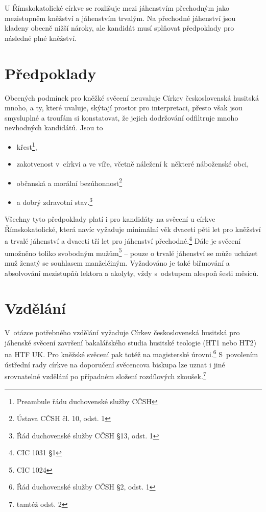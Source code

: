 U Římskokatolické církve se rozlišuje mezi jáhenstvím přechodným jako
mezistupněm kněžství a jáhenstvím trvalým. Na přechodné jáhenství jsou kladeny
obecně nižší nároky, ale kandidát musí splňovat předpoklady pro následné plné
kněžství.

\section{Předpoklady}

Obecných podmínek pro kněžké svěcení neuvaluje Církev československá husitská
mnoho, a ty, které uvaluje, skýtají prostor pro interpretaci, přesto však jsou
smysluplné a troufám si konstatovat, že jejich dodržování odfiltruje mnoho
nevhodných kandidátů. Jsou to
\begin{itemize}
\item{křest\footnote{Preambule řádu duchovenské služby CČSH},}
\item{zakotvenost v~církvi a ve víře, včetně náležení k~některé náboženské obci,}
\item{občanská a morální bezúhonnost\footnote{Ústava CČSH čl. 10, odst. 1}}
\item{a dobrý zdravotní stav.\footnote{Řád duchovenské služby CČSH §13, odst. 1}}
\end{itemize}

Všechny tyto předpoklady platí i pro kandidáty na svěcení u církve
Římskokatolické, která navíc vyžaduje minimální věk dvaceti pěti let pro
kněžství a trvalé jáhenství a dvaceti tří let pro jáhenství
přechodné.\footnote{CIC 1031 §1} Dále je svěcení umožněno toliko svobodným
mužům\footnote{CIC 1024} -- pouze o trvalé jáhenství se může ucházet muž ženatý
se souhlasem manželčiným. Vyžadováno je také biřmování a absolvování mezistupňů
lektora a akolyty, vždy s~odstupem alespoň šesti měsíců.

\section{Vzdělání}

V~otázce potřebného vzdělání vyžaduje Církev československá husitská
pro jáhenské svěcení završení bakalářského studia husitské teologie (HT1 nebo HT2) na HTF UK. Pro
kněžské svěcení pak totéž na magisterské úrovni.\footnote{Řád duchovenské služby
CČSH §2, odst. 1} S~povolením ústřední rady
církve na doporučení svěcencova biskupa lze uznat i jiné srovnatelné vzdělání po
případném složení rozdílových zkoušek.\footnote{tamtéž odst. 2}

